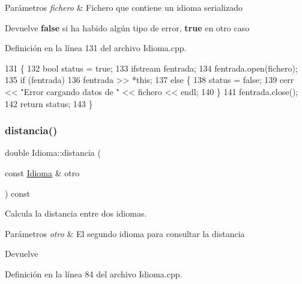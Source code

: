 \begin{DoxyParams}{Parámetros}
{\em fichero} & Fichero que contiene un idioma serializado \\
\hline
\end{DoxyParams}
\begin{DoxyReturn}{Devuelve}
{\bfseries false} si ha habido algún tipo de error, {\bfseries true} en otro caso 
\end{DoxyReturn}


Definición en la línea 131 del archivo Idioma.\+cpp.


\begin{DoxyCode}
131                                                 \{
132     \textcolor{keywordtype}{bool} status = \textcolor{keyword}{true};
133     ifstream fentrada;
134     fentrada.open(fichero);
135     \textcolor{keywordflow}{if} (fentrada)
136         fentrada >> *\textcolor{keyword}{this};
137     \textcolor{keywordflow}{else} \{
138         status = \textcolor{keyword}{false};
139         cerr << \textcolor{stringliteral}{"Error cargando datos de "} << fichero << endl;
140     \}
141     fentrada.close();
142     \textcolor{keywordflow}{return} status;
143 \}
\end{DoxyCode}
\mbox{\label{classIdioma_a6c2901fbfd2f7ee7dead028dac45b44b}} 
\subsubsection{\texorpdfstring{distancia()}{distancia()}}
{\footnotesize\ttfamily double Idioma\+::distancia (\begin{DoxyParamCaption}\item[{const \hyperlink{classIdioma}{Idioma} \&}]{otro }\end{DoxyParamCaption}) const}



Calcula la distancia entre dos idiomas. 


\begin{DoxyParams}{Parámetros}
{\em otro} & El segundo idioma para consultar la distancia \\
\hline
\end{DoxyParams}
\begin{DoxyReturn}{Devuelve}

\end{DoxyReturn}


Definición en la línea 84 del archivo Idioma.\+cpp.


